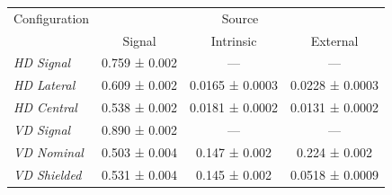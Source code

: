 \begin{tabular}{lccc}
    \toprule
    Configuration & \multicolumn{3}{c}{Source} \\
     & Signal & Intrinsic & External \\
    \midrule
    \emph{HD Signal} & 0.759 ± 0.002 & --- & --- \\
    \emph{HD Lateral} & 0.609 ± 0.002 & 0.0165 ± 0.0003 & 0.0228 ± 0.0003 \\
    \emph{HD Central} & 0.538 ± 0.002 & 0.0181 ± 0.0002 & 0.0131 ± 0.0002 \\
    \emph{VD Signal} & 0.890 ± 0.002 & --- & --- \\
    \emph{VD Nominal} & 0.503 ± 0.004 & 0.147 ± 0.002 & 0.224 ± 0.002 \\
    \emph{VD Shielded} & 0.531 ± 0.004 & 0.145 ± 0.002 & 0.0518 ± 0.0009 \\
    \bottomrule
\end{tabular}

